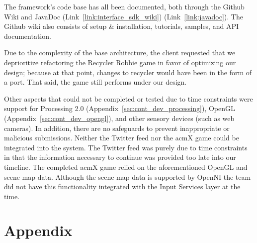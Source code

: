 \documentclass[11pt,letterpaper]{article}
\begin{document}
	The framework's code base has all been documented, both through the Github 
	Wiki and JavaDoc (Link~\ref{link:interface_sdk_wiki})
	(Link~\ref{link:javadoc}). The Github wiki also consists of
		setup \& installation, tutorials, samples, and API documentation.

	Due to the complexity of the base architecture, the client requested that 
	we deprioritize refactoring the Recycler Robbie game in favor of 
	optimizing our design; because at that point, changes to recycler would 
	have been in the form of a port. That said, the game still performs under 
	our design. 

	Other aspects that could not be completed or tested due to time 
	constraints were support for Processing 2.0
	(Appendix~\ref{sec:cont_dev_processing}), OpenGL
	(Appendix~\ref{sec:cont_dev_opengl}), and other sensory 
	devices (such as web cameras). In addition, there are no safeguards to prevent 
	inappropriate or malicious submissions. Neither the Twitter feed nor the 
	acmX game could be integrated into the system. The Twitter feed was purely 
	due to time constraints in that the information necessary to continue was 
	provided too late into our timeline. The completed acmX game relied on the
	aforementioned OpenGL and scene map data.  Although the scene map data is
	supported by OpenNI the team did not have this functionality integrated with
	the Input Services layer at the time.

	\pagebreak

	\appendix
	\section*{Appendix}
	\renewcommand{\thesubsection}{\Alph{subsection}}
   
\end{document}
